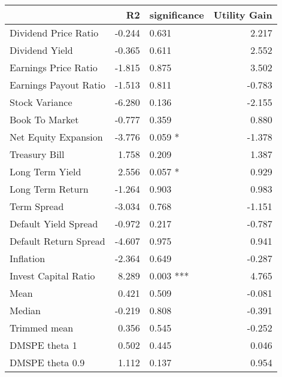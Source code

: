 \begin{tabular}{lrlr}
\toprule
{} &     R2 & significance &  Utility Gain \\
\midrule
Dividend Price Ratio  & -0.244 &       0.631  &         2.217 \\
Dividend Yield        & -0.365 &       0.611  &         2.552 \\
Earnings Price Ratio  & -1.815 &       0.875  &         3.502 \\
Earnings Payout Ratio & -1.513 &       0.811  &        -0.783 \\
Stock Variance        & -6.280 &       0.136  &        -2.155 \\
Book To Market        & -0.777 &       0.359  &         0.880 \\
Net Equity Expansion  & -3.776 &      0.059 * &        -1.378 \\
Treasury Bill         &  1.758 &       0.209  &         1.387 \\
Long Term Yield       &  2.556 &      0.057 * &         0.929 \\
Long Term Return      & -1.264 &       0.903  &         0.983 \\
Term Spread           & -3.034 &       0.768  &        -1.151 \\
Default Yield Spread  & -0.972 &       0.217  &        -0.787 \\
Default Return Spread & -4.607 &       0.975  &         0.941 \\
Inflation             & -2.364 &       0.649  &        -0.287 \\
Invest Capital Ratio  &  8.289 &    0.003 *** &         4.765 \\
Mean                  &  0.421 &       0.509  &        -0.081 \\
Median                & -0.219 &       0.808  &        -0.391 \\
Trimmed mean          &  0.356 &       0.545  &        -0.252 \\
DMSPE theta 1         &  0.502 &       0.445  &         0.046 \\
DMSPE theta 0.9       &  1.112 &       0.137  &         0.954 \\
\bottomrule
\end{tabular}
